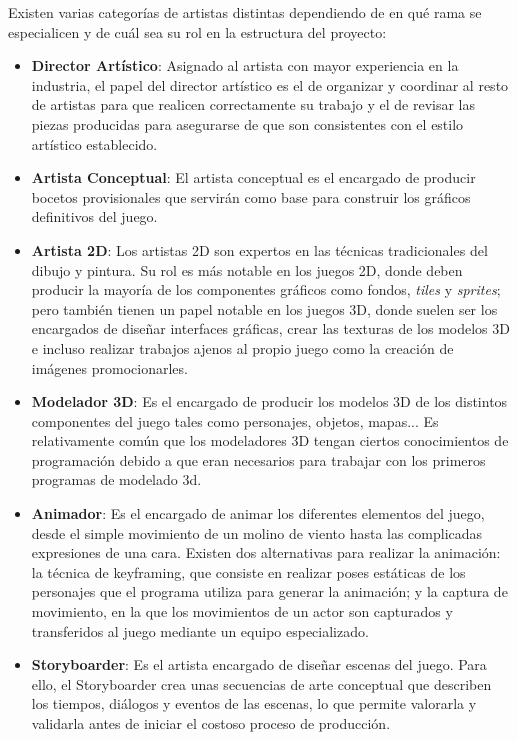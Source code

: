 Existen varias categorías de artistas distintas dependiendo de en qué rama se especialicen y de cuál sea su rol en la estructura del proyecto\cite{development_and_production}:
\begin{itemize}
\item \textbf{Director Artístico}: Asignado al artista con mayor experiencia en la industria, el papel del director artístico es el de organizar y coordinar al resto de artistas para que realicen correctamente su trabajo y el de revisar las piezas producidas para asegurarse de que son consistentes con el estilo artístico establecido.
\item \textbf{Artista Conceptual}: El artista conceptual es el encargado de producir bocetos provisionales que servirán como base para construir los gráficos definitivos del juego.
\item \textbf{Artista 2D}: Los artistas 2D son expertos en las técnicas tradicionales del dibujo y pintura.  Su rol es más notable en los juegos 2D, donde deben producir la mayoría de los componentes gráficos como fondos, \textit{tiles} y \textit{sprites}; pero también tienen un papel notable en los juegos 3D, donde suelen ser los encargados de diseñar interfaces gráficas, crear las texturas de los modelos 3D e incluso realizar trabajos ajenos al propio juego como la creación de imágenes promocionarles.
\item \textbf{Modelador 3D}: Es el encargado de producir los modelos 3D de los distintos componentes del juego tales como personajes, objetos, mapas...  Es relativamente común que los modeladores 3D tengan ciertos conocimientos de programación debido a que eran necesarios para trabajar con los primeros programas de modelado 3d.
\item \textbf{Animador}: Es el encargado de animar los diferentes elementos del juego, desde el simple movimiento de un molino de viento hasta las complicadas expresiones de una cara. Existen dos alternativas para realizar la animación: la técnica de keyframing, que consiste en realizar poses estáticas de los personajes que el programa utiliza para generar la animación; y la captura de movimiento, en la que los movimientos de un actor son capturados y transferidos al juego mediante un equipo especializado.
\item \textbf{Storyboarder}: Es el artista encargado de diseñar escenas del juego. Para ello, el Storyboarder crea unas secuencias de arte conceptual que describen los tiempos, diálogos y eventos de las escenas, lo que permite valorarla y validarla antes de iniciar el costoso proceso de producción.
\end{itemize}
